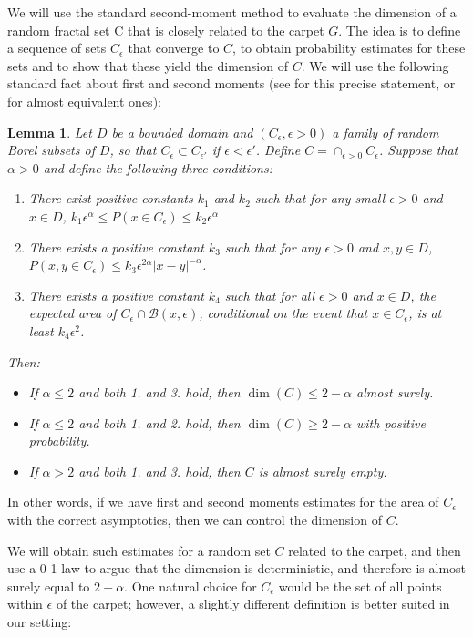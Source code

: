 \documentclass[11pt]{article}
\newtheorem {lemma} [Theorem]    {Lemma}
\newcommand{\eps}{\epsilon}
\newcommand{\PP}{{ P}}
\newcommand{\B}{{\mathcal B}}
\begin{document}
We will use the standard second-moment method to evaluate the dimension
of a random fractal set C that is closely related to the carpet $G$. The idea
is to define a sequence of sets $C_\eps$ that converge to $C$,
to obtain probability estimates for these sets and to show that these
yield the dimension of $C$. We will use the following standard fact about first and second moments (see \cite{BeThese}
for this precise statement, or \cite {MP} for almost equivalent ones):

\begin{lemma}
\label {bef}
Let $D$ be a bounded domain and $( C_\eps, {\eps > 0})$ a  family of random Borel
subsets of $D$, so that $ C_\eps \subset C_{\eps'} $ if $\eps<\eps'$.
Define $C= \cap_{\eps >0} C_\eps$. 
Suppose that $\alpha >0$ and define the following three conditions: 
\begin {enumerate}
\item There exist positive constants
$k_1$ and $k_2$ such that 
for any small $\eps>0$ and $x \in D$, 
$k_1 \eps^\alpha \le \PP(x \in C_\eps) \le k_2 \eps^\alpha$.
\item
There exists a positive constant
$k_3$ such that 
for any $\eps>0$ and $x, y \in D$,
$\PP(x, y \in C_\eps) \le k_3  \eps^{2\alpha} |x-y|^{-\alpha}$.
\item
There exists  a positive constant
$k_4$ such that 
for all $\eps>0$ and $x \in D$, the expected area of $C_{\eps} \cap \B(x,\eps)$,
conditional on the event that $x \in C_\eps$,
is at least  $k_4 \eps^2$.
\end {enumerate}
Then:
\begin {itemize}
\item If $\alpha \le 2$ and both 1. and 3. hold, then $\dim (C) \le 2 - \alpha$ almost surely.
\item If $\alpha \le 2$ and both 1. and 2. hold, then $\dim (C) \ge 2 - \alpha$ with positive probability.
\item If $\alpha > 2$ and both 1. and 3. hold, then $C$ is almost surely empty.
\end {itemize} 
\end{lemma}

In other words, if we have  first and second moments estimates 
for the area of $C_\eps$ with the correct asymptotics, then we can
control the dimension of $C$. 

We will obtain such estimates for a random set $C$ related to the carpet, and then use a 0-1 law
to argue that the dimension is deterministic, and therefore
is almost surely equal to $2- \alpha$.
One natural choice for $C_\eps$
would be the set of all points within $\eps$ of the carpet;  however,
a slightly different definition is better suited in our setting:
\end{document}
